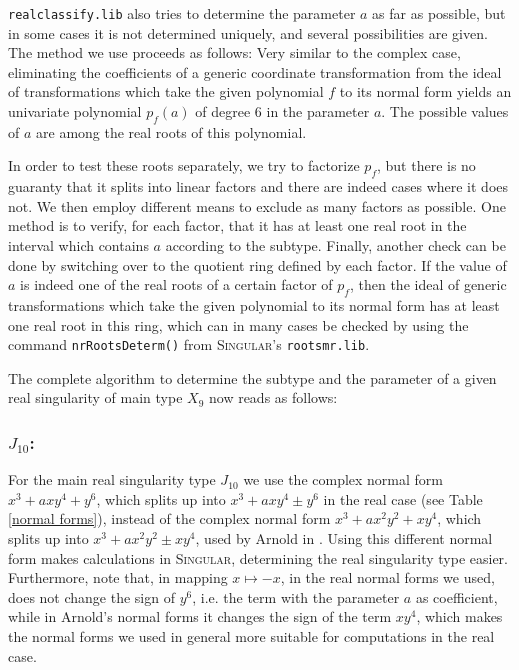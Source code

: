 \documentclass[noend]{amsproc}
\theoremstyle{definition}
\newcommand{\Singular}{\textsc{Singular}}
\newcommand{\realclassify}{\texttt{realclassify.lib}}
\begin{document}
\realclassify{} also tries to determine the parameter $a$ as far as possible,
but in some cases it is not determined uniquely, and several possibilities are
given. The method we use proceeds as follows: Very similar to the complex case,
eliminating the coefficients of a generic coordinate transformation from the
ideal of transformations which take the given polynomial $f$ to its normal form
yields an univariate polynomial $p_f(a)$ of degree 6 in the parameter $a$. The
possible values of $a$ are among the real roots of this polynomial.

In order to
test these roots separately, we try to factorize $p_f$, but there is no
guaranty that it splits into linear factors and there are indeed cases where it
does not. We then employ different means to exclude as many
factors as possible. One method is to verify, for each factor, that it has at
least one real root in the interval which contains $a$ according to the
subtype. Finally, another check can be done by switching over to the
quotient ring defined by each factor. If the value of $a$ is indeed one of the
real roots of a certain factor of $p_f$, then the ideal of generic
transformations which take the given polynomial to its normal form has at least
one real root in this ring, which can in many cases be checked by using the
command \texttt{nrRootsDeterm()} from \Singular{}'s \texttt{rootsmr.lib}.

The complete algorithm to determine the subtype and the parameter of a given
real singularity of main type $X_9$ now reads as follows:


\subsubsection{$J_{10}$:}
For the main real singularity type $J_{10}$ we use the complex normal form
$x^3+axy^4+ y^6$, which splits up into $x^3+axy^4\pm y^6$ in the real case (see
Table \ref{normal forms}),  instead of the complex normal form
$x^3+ax^2y^2+xy^4$, which splits up into $x^3+ax^2y^2\pm xy^4$, used by Arnold
in \cite{AVG1985}. Using this different normal form makes calculations in
\textsc{Singular}, determining the real singularity type easier. Furthermore,
note that, in mapping $x\mapsto -x$, in the real normal forms we used, does not
change the sign of $y^6$, i.e. the term with the parameter $a$ as coefficient, while in Arnold's normal forms it changes the sign of
the term $xy^4$, which makes the normal forms we used in general more suitable
for computations in  the real case.
\end{document}
